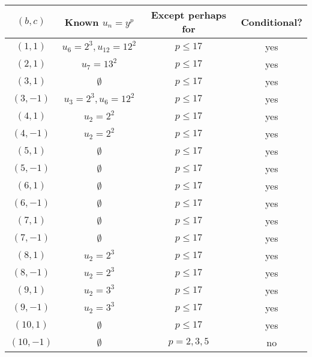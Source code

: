 \documentclass[12pt]{amsart}
\theoremstyle{definition}
\begin{document}
\begin{center}
\begin{tabular}{c c c c}
$(b,c)$ & Known $u_n = y^p$ & Except perhaps for & Conditional?  \\  \hline \hline
$(1,1)$ & $u_6=2^3, u_{12} = 12^2$ & $p\leq 17$ & yes \\
$(2,1)$ & $u_7=13^2$ & $p \leq 17$ & yes \\
$(3,1)$ & $\emptyset$ & $p \leq 17$ & yes \\
$(3,-1)$ & $u_3 = 2^3, u_6 = 12^2$ & $p \leq 17$ & yes \\
$(4,1)$ & $u_2 = 2^2$ & $p \leq 17$ & yes \\
$(4,-1)$ & $u_2 = 2^2$ & $p \leq 17$ & yes \\
$(5,1)$ & $\emptyset$ & $p \leq 17$ & yes \\
$(5,-1)$ & $\emptyset$ & $p \leq 17$ & yes \\
$(6,1)$ & $\emptyset$ & $p \leq 17$ & yes \\
$(6,-1)$ & $\emptyset$ & $p \leq 17$ & yes \\
$(7,1)$ & $\emptyset$ & $p \leq 17$ & yes \\
$(7,-1)$ & $\emptyset$ & $p \leq 17$ & yes \\
$(8,1)$ & $u_2 = 2^3$ & $p \leq 17$ & yes \\
$(8,-1)$ & $u_2 = 2^3$ & $p \leq 17$ & yes \\
$(9,1)$ & $u_2 = 3^3$ & $p \leq 17$ & yes \\
$(9,-1)$ & $u_2 = 3^3$ & $p \leq 17$ & yes \\
$(10,1)$ & $\emptyset$ & $p\leq 17$ & yes \\
$(10,-1)$ & $\emptyset$ & $p=2,3,5$ & no \\ \hline \hline
\end{tabular}
\end{center}

\pagebreak
{}

\end{document}
